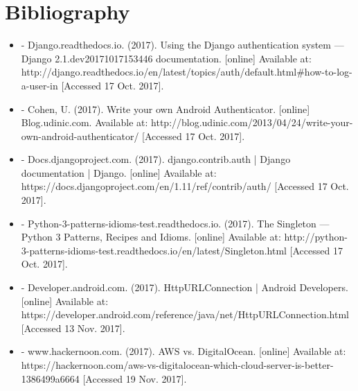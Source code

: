 \documentclass{article}
\begin{document}
\section{Bibliography}
\begin{itemize}
    \item -  Django.readthedocs.io. (2017). Using the Django authentication system — Django 2.1.dev20171017153446 documentation. [online] Available at: http://django.readthedocs.io/en/latest/topics/auth/default.html#how-to-log-a-user-in [Accessed 17 Oct. 2017].
    \item -  Cohen, U. (2017). Write your own Android Authenticator. [online] Blog.udinic.com. Available at: http://blog.udinic.com/2013/04/24/write-your-own-android-authenticator/ [Accessed 17 Oct. 2017].
    \item - Docs.djangoproject.com. (2017). django.contrib.auth | Django documentation | Django. [online] Available at: https://docs.djangoproject.com/en/1.11/ref/contrib/auth/ [Accessed 17 Oct. 2017].
    \item - Python-3-patterns-idioms-test.readthedocs.io. (2017). The Singleton — Python 3 Patterns, Recipes and Idioms. [online] Available at: http://python-3-patterns-idioms-test.readthedocs.io/en/latest/Singleton.html [Accessed 17 Oct. 2017].
    \item - Developer.android.com. (2017). HttpURLConnection | Android Developers. [online] Available at: https://developer.android.com/reference/java/net/HttpURLConnection.html [Accessed 13 Nov. 2017].
    \item - www.hackernoon.com. (2017). AWS vs. DigitalOcean. [online] Available at: https://hackernoon.com/aws-vs-digitalocean-which-cloud-server-is-better-1386499a6664 [Accessed 19 Nov. 2017].
\end{itemize}




\end{document}
